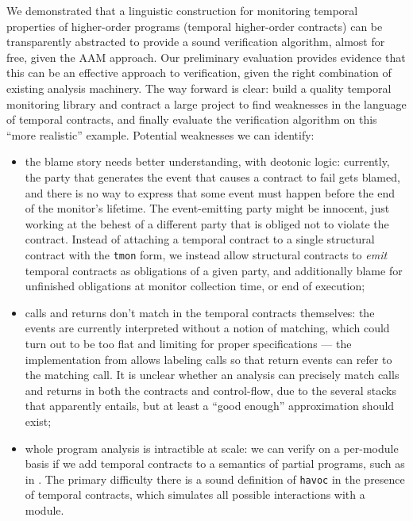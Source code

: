 We demonstrated that a linguistic construction for monitoring temporal properties of higher-order programs (temporal higher-order contracts) can be transparently abstracted to provide a sound verification algorithm, almost for free, given the AAM approach.
%
Our preliminary evaluation provides evidence that this can be an effective approach to verification, given the right combination of existing analysis machinery.
%
The way forward is clear: build a quality temporal monitoring library and contract a large project to find weaknesses in the language of temporal contracts, and finally evaluate the verification algorithm on this ``more realistic'' example.
%
Potential weaknesses we can identify:
\begin{itemize}
\item{the blame story needs better understanding, with deotonic logic:
%
currently, the party that generates the event that causes a contract to fail gets blamed, and there is no way to express that some event must happen before the end of the monitor's lifetime.
%
The event-emitting party might be innocent, just working at the behest of a different party that is obliged not to violate the contract.
%
Instead of attaching a temporal contract to a single structural contract with the {\tt tmon} form, we instead allow structural contracts to \emph{emit} temporal contracts as obligations of a given party, and additionally blame for unfinished obligations at monitor collection time, or end of execution;
}
%
\item{calls and returns don't match in the temporal contracts themselves:
%
the events are currently interpreted without a notion of matching, which could turn out to be too flat and limiting for proper specifications --- the implementation from \dfm allows labeling calls so that return events can refer to the matching call.
%
It is unclear whether an analysis can precisely match calls and returns in both the contracts and control-flow, due to the several stacks that apparently entails, but at least a ``good enough'' approximation should exist;
}
%
\item{whole program analysis is intractible at scale:
%
we can verify on a per-module basis if we add temporal contracts to a semantics of partial programs, such as in \citet{dvanhorn:TobinHochstadt2012Higherorder}.
%
The primary difficulty there is a sound definition of {\tt havoc} in the presence of temporal contracts, which simulates all possible interactions with a module.
}
\end{itemize}
%

%
